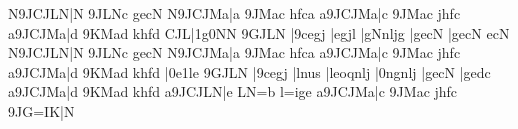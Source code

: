 \cinqx N{\qqbbH9JCJLN}|\Sfwu N\enotes
\temps\notes\qqbbl9JLNc\enotes
\motif gecN\relax
\xbarre\addspace{ -0.3\elemskip}\relax
\notes\LPED\qsoupir{}\relax
\cinqx N{\qqbbH9JCJMa}|\Sfwu a\enotes
\temps\notes\qqbbl9JMac\enotes
\motif hfca\relax
\xbarre\addspace{-0.3\elemskip}\notes\LPED\qsoupir
\cinqx a{\qqbbH9JCJMa}|\Sfwu c\enotes
\temps\notes\qqbbl9JMac\enotes
\motif jhfc\relax
\xbarre\addspace{-0.3\elemskip}\notes\LPED\qsoupir
\cinqx a{\qqbbH9JCJMa}|\Sfwu d\enotes
\temps\notes\qqbbl9KMad\enotes
\motif khfd\relax
\barre\notes\LPED\qsoupir
{\Tqbbu CJL}|\itenu1g\itenl0N\Sfwu N\enotes
\temps\notes\qqbbl9GJLN\enotes
\zbarre\notes|\qqbbl9cegj\enotes
\temps\notes|\ccl e\Tqbbu gjl\enotes
\barre\notes|\zh g\zhl Nnljg\enotes
\temps\notes|gecN\enotes
\zbarre\notes|gecN\enotes
\temps\notes\rlap{\sk\sk\DEP}ecN\enotes
\barre\notes\LPED\qsoupir{}\relax
\cinqx N{\qqbbH9JCJLN}|\Sfwu N\enotes
\temps\notes\qqbbl9JLNc\enotes
\motif gecN\relax
\alaligne{}\notes\LPED\qsoupir
\cinqx N{\qqbbH9JCJMa}|\Sfwu a\enotes
\temps\notes\qqbbl9JMac\enotes
\motif hfca\relax
\barre\notes\LPED\qsoupir
\cinqx a{\qqbbH9JCJMa}|\Sfwu c\enotes
\temps\notes\qqbbl9JMac\enotes
\motif jhfc\relax
\barre\notes\LPED\qsoupir
\cinqx a{\qqbbH9JCJMa}|\Sfwu d\enotes
\temps\notes\qqbbl9KMad\enotes
\motif khfd\relax
\barre\notes\LPED{}|\itenl0e\itenu1l\Sfwu e\enotes
\temps\notes\qqbbl9GJLN\enotes
\zbarre\notes|\qqbbl9cegj\enotes
\temps\notes|lnus\enotes
\barre\notes|\zh l\zhl eoqnlj\enotes
\temps\notes|\qqbbH0ngnlj\enotes
\zbarre\notes|\raise \Interligne\rlap{\hpause}gecN\enotes
\temps\notes\sk\sk\sk\DEP|gedc\enotes
\barre\notes\LPED{}\qsk\qsoupir
\cinqx a{\qqbbH9JCJMa}|\Sfwu d\enotes
\temps\notes\qqbbl9KMad\enotes
\motif khfd\relax
\barre\notes\LPED\qsoupir
\cinqx a{\qqbbH9JCJLN}|\Sfwu e\enotes
\temps\notes{}LN{=b}\enotes
\motif l{=i}ge\relax
\barre\notes\LPED\qsoupir
\cinqx a{\qqbbH9JCJMa}|\Sfwu c\enotes
\temps\notes\qqbbl9JMac\enotes
\motif jhfc\relax
\barre\notes\LPED\qsoupir
{\tqbbH9JG{=I}K}|\Sfwu N\enotes
